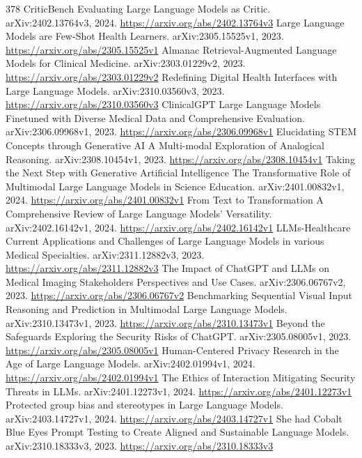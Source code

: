 \documentclass[11pt]{article}
\begin{document}
\begin{thebibliography}{378}
 CriticBench Evaluating Large Language Models as Critic. arXiv:2402.13764v3, 2024. \url{https://arxiv.org/abs/2402.13764v3}
 Large Language Models are Few-Shot Health Learners. arXiv:2305.15525v1, 2023. \url{https://arxiv.org/abs/2305.15525v1}
 Almanac Retrieval-Augmented Language Models for Clinical Medicine. arXiv:2303.01229v2, 2023. \url{https://arxiv.org/abs/2303.01229v2}
 Redefining Digital Health Interfaces with Large Language Models. arXiv:2310.03560v3, 2023. \url{https://arxiv.org/abs/2310.03560v3}
 ClinicalGPT Large Language Models Finetuned with Diverse Medical Data and Comprehensive Evaluation. arXiv:2306.09968v1, 2023. \url{https://arxiv.org/abs/2306.09968v1}
 Elucidating STEM Concepts through Generative AI A Multi-modal Exploration of Analogical Reasoning. arXiv:2308.10454v1, 2023. \url{https://arxiv.org/abs/2308.10454v1}
 Taking the Next Step with Generative Artificial Intelligence The Transformative Role of Multimodal Large Language Models in Science Education. arXiv:2401.00832v1, 2024. \url{https://arxiv.org/abs/2401.00832v1}
 From Text to Transformation A Comprehensive Review of Large Language Models' Versatility. arXiv:2402.16142v1, 2024. \url{https://arxiv.org/abs/2402.16142v1}
 LLMs-Healthcare Current Applications and Challenges of Large Language Models in various Medical Specialties. arXiv:2311.12882v3, 2023. \url{https://arxiv.org/abs/2311.12882v3}
 The Impact of ChatGPT and LLMs on Medical Imaging Stakeholders Perspectives and Use Cases. arXiv:2306.06767v2, 2023. \url{https://arxiv.org/abs/2306.06767v2}
 Benchmarking Sequential Visual Input Reasoning and Prediction in Multimodal Large Language Models. arXiv:2310.13473v1, 2023. \url{https://arxiv.org/abs/2310.13473v1}
 Beyond the Safeguards Exploring the Security Risks of ChatGPT. arXiv:2305.08005v1, 2023. \url{https://arxiv.org/abs/2305.08005v1}
 Human-Centered Privacy Research in the Age of Large Language Models. arXiv:2402.01994v1, 2024. \url{https://arxiv.org/abs/2402.01994v1}
 The Ethics of Interaction Mitigating Security Threats in LLMs. arXiv:2401.12273v1, 2024. \url{https://arxiv.org/abs/2401.12273v1}
 Protected group bias and stereotypes in Large Language Models. arXiv:2403.14727v1, 2024. \url{https://arxiv.org/abs/2403.14727v1}
 She had Cobalt Blue Eyes Prompt Testing to Create Aligned and Sustainable Language Models. arXiv:2310.18333v3, 2023. \url{https://arxiv.org/abs/2310.18333v3}

\end{thebibliography}
\end{document}
